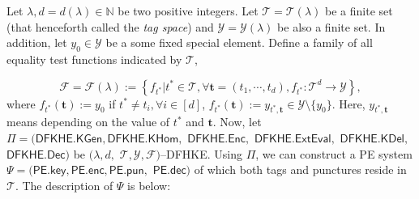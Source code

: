 \documentclass[runningheads,10pt]{llncs}
\begin{document}
Let $\lambda, d=d(\lambda) \in \mathbb{N}$ be two positive integers. 
Let $\mathcal{T}=\mathcal{T}({\lambda})$ be a finite set (that henceforth called the \textit{tag space}) and $\mathcal{Y}=\mathcal{Y}({\lambda})$ 
be also a finite set. In addition, let  $y_0\in \mathcal{Y}$ be a some fixed special element. 
Define a family of all equality test functions indicated by $\mathcal{T}$,  

\begin{equation}\label{eq10}
\mathcal{F}=\mathcal{F}({\lambda}):=\left \{ f_{t^*}| t^* \in \mathcal{T}, \forall  \mathbf{t}=(t_1, \cdots, t_d), f_{t^*}: \mathcal{T}^d  \rightarrow \mathcal{Y}  \right \},
\end{equation}
where $f_{t^*}(\mathbf{t}):=y_0$  if $t^* \neq  t_i, \forall i\in[d]$, $f_{t^*}(\mathbf{t}):= y_{t^*,\mathbf{t}}\in \mathcal{Y}\setminus \{y_0\}$.  
Here, $y_{t^*,\mathbf{t}}$ means depending on the value of $t^*$ and $\mathbf{t}$. 
Now, let  $\Pi=(\mathsf{DFKHE.KGen},  \mathsf{DFKHE.KHom},  $ $ \mathsf{DFKHE.Enc}, $  $ \mathsf{DFKHE.ExtEval},$ $ \mathsf{DFKHE.KDel},$ $\mathsf{DFKHE.Dec} )$ be  $(\lambda, d,$ $\mathcal{T}, \mathcal{Y}, \mathcal{F})$--DFHKE. 
   Using  $\Pi$, we can construct a PE system $\Psi=(\mathsf{PE.key}, \mathsf{PE.enc}, \mathsf{PE.pun},$ $ \mathsf{PE.dec} )$ of which both tags and punctures reside in $ \mathcal{T}$. The description of $\Psi$ is below:
\end{document}
